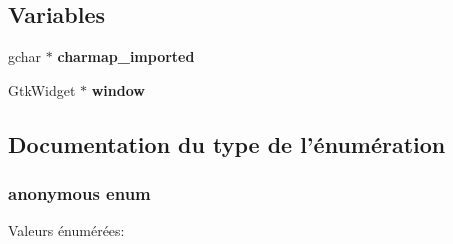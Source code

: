 \subsection*{Variables}
\begin{DoxyCompactItemize}
\item 
gchar $\ast$ {\bf charmap\_\-imported}
\item 
GtkWidget $\ast$ {\bf window}
\end{DoxyCompactItemize}


\subsection{Documentation du type de l'énumération}
\subsubsection[{"@12}]{\setlength{\rightskip}{0pt plus 5cm}anonymous enum}\label{utils__files_8c_ac36f475ca5b446f4fde4c9b90bec77c8}
\begin{Desc}
\item[Valeurs énumérées: ]\par
\begin{description}
\item[{\em 
IMPORT\_\-CHARMAP\_\-SELECTED\label{utils__files_8c_ac36f475ca5b446f4fde4c9b90bec77c8a1a848c6b31ada54e40a41c3dd784cb9b}
}]\item[{\em 
IMPORT\_\-CHARMAP\_\-ENCODING\label{utils__files_8c_ac36f475ca5b446f4fde4c9b90bec77c8a55ec3f5f5686aae4016b11a99e12d77d}
}]\item[{\em 
IMPORT\_\-CHARMAP\_\-RESULT\label{utils__files_8c_ac36f475ca5b446f4fde4c9b90bec77c8ac1e0ea8b2ea01ee48177ba3c15f55051}
}]\item[{\em 
IMPORT\_\-CHARMAP\_\-NB\label{utils__files_8c_ac36f475ca5b446f4fde4c9b90bec77c8a2e9758d15b18219e6bd3807ea0dbe5fe}
}]\end{description}
\end{Desc}



